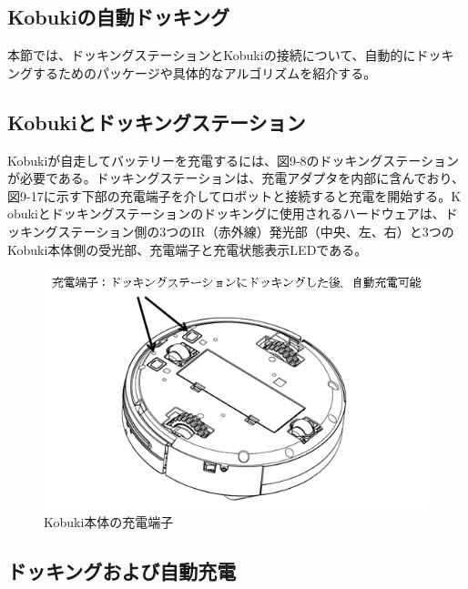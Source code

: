 \begin{itemize}
\section{Kobukiの自動ドッキング}

本節では、ドッキングステーションとKobukiの接続について、自動的にドッキングするためのパッケージや具体的なアルゴリズムを紹介する。

  \subsection{Kobukiとドッキングステーション}

Kobukiが自走してバッテリーを充電するには、図9-8のドッキングステーションが必要である。ドッキングステーションは、充電アダプタを内部に含んでおり、図9-17に示す下部の充電端子を介してロボットと接続すると充電を開始する。K obukiとドッキングステーションのドッキングに使用されるハードウェアは、ドッキングステーション側の3つのIR（赤外線）発光部（中央、左、右）と3つのKobuki本体側の受光部、充電端子と充電状態表示LEDである。

\begin{figure}[ht]
  \centering
  \includegraphics[width=\columnwidth]{pictures/chapter9/pic_09_17.png}
  \caption{Kobuki本体の充電端子}
\end{figure}

\subsection{ドッキングおよび自動充電}


\end{itemize}
